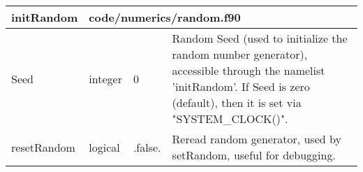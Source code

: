 \documentclass{article}
\begin{document}

\begin{longtable}{llll}
\toprule
\textbf{\large{initRandom}} & \multicolumn{3}{l}{\footnotesize{code/numerics/random.f90}}\\*
\midrule
\endfirsthead
\midrule
\endhead
Seed & \begin{minipage}[t]{2cm}integer\end{minipage} & \begin{minipage}[t]{2cm}0\end{minipage} & \begin{minipage}[t]{12cm}Random Seed (used to initialize the random number generator), accessible through the namelist 'initRandom'. If Seed is zero (default), then it is set via "SYSTEM\_CLOCK()".\end{minipage}\\*
\midrule
resetRandom & \begin{minipage}[t]{2cm}logical\end{minipage} & \begin{minipage}[t]{2cm}.false.\end{minipage} & \begin{minipage}[t]{12cm}Reread random generator, used by setRandom, useful for debugging.\end{minipage}\\*
\bottomrule
\end{longtable}
{ }



\end{document}
